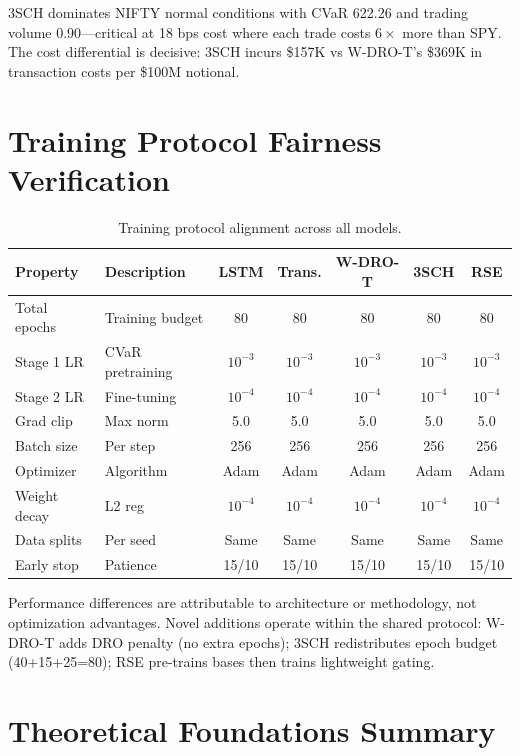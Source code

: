 \documentclass[11pt,oneside]{report}
\begin{document}
3SCH dominates NIFTY normal conditions with CVaR 622.26 and trading volume 0.90---critical at 18 bps cost where each trade costs $6\times$ more than SPY. The cost differential is decisive: 3SCH incurs \$157K vs W-DRO-T's \$369K in transaction costs per \$100M notional.

\chapter{Training Protocol Fairness Verification}
\label{app:fairness}

\begin{table}[H]
\centering\scriptsize
\caption{Training protocol alignment across all models.}
\begin{tabularx}{\textwidth}{@{}lXccccc@{}}
\toprule
\textbf{Property} & \textbf{Description} & \textbf{LSTM} & \textbf{Trans.} & \textbf{W-DRO-T} & \textbf{3SCH} & \textbf{RSE} \\\midrule
Total epochs & Training budget & 80 & 80 & 80 & 80 & 80 \\
Stage 1 LR & CVaR pretraining & $10^{-3}$ & $10^{-3}$ & $10^{-3}$ & $10^{-3}$ & $10^{-3}$ \\
Stage 2 LR & Fine-tuning & $10^{-4}$ & $10^{-4}$ & $10^{-4}$ & $10^{-4}$ & $10^{-4}$ \\
Grad clip & Max norm & 5.0 & 5.0 & 5.0 & 5.0 & 5.0 \\
Batch size & Per step & 256 & 256 & 256 & 256 & 256 \\
Optimizer & Algorithm & Adam & Adam & Adam & Adam & Adam \\
Weight decay & L2 reg & $10^{-4}$ & $10^{-4}$ & $10^{-4}$ & $10^{-4}$ & $10^{-4}$ \\
Data splits & Per seed & Same & Same & Same & Same & Same \\
Early stop & Patience & 15/10 & 15/10 & 15/10 & 15/10 & 15/10 \\
\bottomrule
\end{tabularx}
\end{table}

Performance differences are attributable to architecture or methodology, not optimization advantages. Novel additions operate within the shared protocol: W-DRO-T adds DRO penalty (no extra epochs); 3SCH redistributes epoch budget (40+15+25=80); RSE pre-trains bases then trains lightweight gating.

\chapter{Theoretical Foundations Summary}
\label{app:theory}
\end{document}
